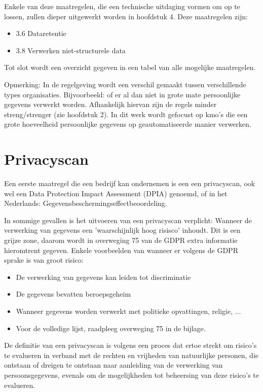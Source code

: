 Enkele van deze maatregelen, die een technische uitdaging vormen om op te lossen, zullen dieper uitgewerkt worden in hoofdstuk 4. Deze maatregelen zijn: 
\begin{itemize}
    \item 3.6 Dataretentie
    \item 3.8 Verwerken niet-structurele data
\end{itemize}

Tot slot wordt een overzicht gegeven in een tabel van alle mogelijke maatregelen. 

Opmerking: In de regelgeving wordt een verschil gemaakt tussen verschillende types organisaties. Bijvoorbeeld: of er al dan niet in grote mate persoonlijke gegevens verwerkt worden. Afhankelijk hiervan zijn de regels minder streng/strenger (zie hoofdstuk 2). In dit werk wordt gefocust op kmo's die een grote hoeveelheid persoonlijke gegevens op geautomatiseerde manier verwerken.  

\section{Privacyscan}
Een eerste maatregel die een bedrijf kan ondernemen is een een privacyscan, ook wel een Data Protection Impact Assessment (DPIA) genoemd, of in het Nederlands: Gegevensbeschermingseffectbeoordeling. 

In sommige gevallen is het uitvoeren van een privacyscan verplicht: 
Wanneer de verwerking van gegevens een 'waarschijnlijk hoog risisco' inhoudt. Dit is een grijze zone, daarom wordt in overweging 75 van de GDPR extra informatie hieromtrent gegeven. Enkele voorbeelden van wanneer er volgens de GDPR sprake is van groot risico: 

\begin{itemize}
	\item De verwerking van gegevens kan leiden tot discriminatie
	\item De gegevens bevatten beroepsgeheim
	\item Wanneer gegevens worden verwerkt met politieke opvattingen, religie, ... 
	\item Voor de volledige lijst, raadpleeg overweging 75 in de bijlage. 
\end{itemize}

De definitie van een privacyscan is volgens \textcite{ConXioN2017} een proces dat ertoe strekt om risico’s te evalueren in verband met de rechten en vrijheden van natuurlijke personen, die ontstaan of dreigen te ontstaan naar aanleiding van de verwerking van persoonsgegevens, evenals om de mogelijkheden tot beheersing van deze risico’s te evalueren.

